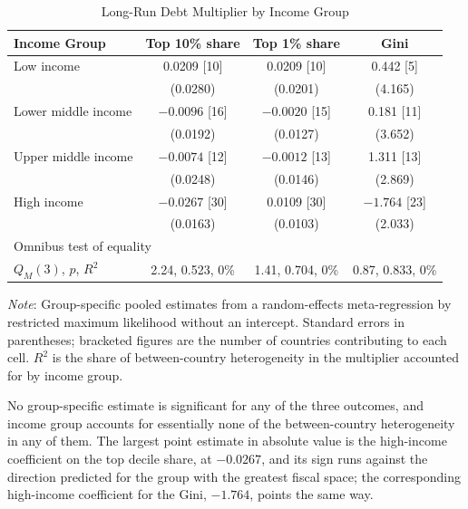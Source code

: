 \documentclass[12pt, titlepage]{article}
\numberwithin{equation}{section}
\begin{document}
\begin{table}[htbp]
	\centering
	\begin{threeparttable}
		\caption{Long-Run Debt Multiplier by Income Group}
		\label{table:meta_regression}
		\begin{small}
			\begin{tabular}{lccc}
				\toprule
				\textbf{Income Group} & \textbf{Top 10\% share} & \textbf{Top 1\% share} & \textbf{Gini} \\
				\midrule
				Low income          & \phantom{$-$}0.0209 [10] & \phantom{$-$}0.0209 [10] & \phantom{$-$}0.442 [5]  \\
				& (0.0280) & (0.0201) & (4.165) \\
				\addlinespace
				Lower middle income & $-0.0096$ [16] & $-0.0020$ [15] & \phantom{$-$}0.181 [11] \\
				& (0.0192) & (0.0127) & (3.652) \\
				\addlinespace
				Upper middle income & $-0.0074$ [12] & $-0.0012$ [13] & \phantom{$-$}1.311 [13] \\
				& (0.0248) & (0.0146) & (2.869) \\
				\addlinespace
				High income         & $-0.0267$ [30] & \phantom{$-$}0.0109 [30] & $-1.764$ [23] \\
				& (0.0163) & (0.0103) & (2.033) \\
				\midrule
				\multicolumn{4}{l}{Omnibus test of equality} \\
				$Q_{M}(3)$, $p$, $R^{2}$ & 2.24, 0.523, 0\% & 1.41, 0.704, 0\% & 0.87, 0.833, 0\% \\
				\bottomrule
			\end{tabular}
		\end{small}
		\begin{tablenotes}
			\footnotesize
			\item \emph{Note}: Group-specific pooled estimates from a random-effects
			meta-regression by restricted maximum likelihood without an intercept.
			Standard errors in parentheses; bracketed figures are the number of
			countries contributing to each cell. $R^{2}$ is the share of
			between-country heterogeneity in the multiplier accounted for by income
			group.
		\end{tablenotes}
	\end{threeparttable}
\end{table}

No group-specific estimate is significant for any of the three outcomes, and
income group accounts for essentially none of the between-country
heterogeneity in any of them. The largest point estimate in absolute value is
the high-income coefficient on the top decile share, at $-0.0267$, and its
sign runs against the direction predicted for the group with the greatest
fiscal space; the corresponding high-income coefficient for the Gini,
$-1.764$, points the same way.
\end{document}
